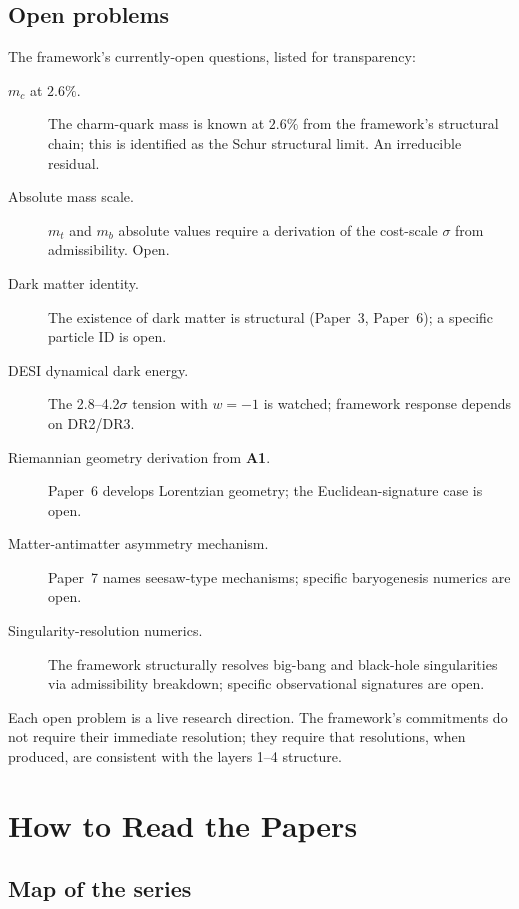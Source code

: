 \documentclass[11pt]{article}
\newcommand{\Aone}{\textbf{A1}}
\begin{document}
\subsection{Open problems}\label{sec:open_problems}

The framework's currently-open questions, listed for transparency:

\begin{description}
    \item[$m_c$ at $2.6\%$.] The charm-quark mass is known at $2.6\%$ from the framework's structural chain; this is identified as the Schur structural limit. An irreducible residual.
    \item[Absolute mass scale.] $m_t$ and $m_b$ absolute values require a derivation of the cost-scale $\sigma$ from admissibility. Open.
    \item[Dark matter identity.] The existence of dark matter is structural (Paper~3, Paper~6); a specific particle ID is open.
    \item[DESI dynamical dark energy.] The 2.8--4.2$\sigma$ tension with $w = -1$ is watched; framework response depends on DR2/DR3.
    \item[Riemannian geometry derivation from \Aone{}.] Paper~6 develops Lorentzian geometry; the Euclidean-signature case is open.
    \item[Matter-antimatter asymmetry mechanism.] Paper~7 names seesaw-type mechanisms; specific baryogenesis numerics are open.
    \item[Singularity-resolution numerics.] The framework structurally resolves big-bang and black-hole singularities via admissibility breakdown; specific observational signatures are open.
\end{description}

\noindent Each open problem is a live research direction. The framework's commitments do not require their immediate resolution; they require that resolutions, when produced, are consistent with the layers 1--4 structure.

\clearpage

\section{How to Read the Papers}\label{sec:how_to_read}

\subsection{Map of the series}\label{sec:series_map}
\end{document}
